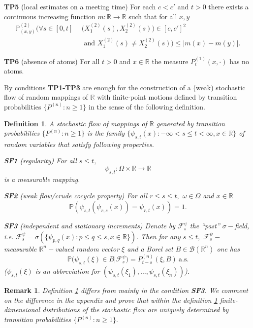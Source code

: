 \documentclass[a4paper,12pt]{article}
\newcommand{\1}{1\!\!\,{\rm I}}
\theoremstyle{plain}
\newtheorem{remark}{Remark}[section]
\newtheorem{definition}{Definition}[section]
\begin{document}
{\bf TP5} (local estimates on a meeting time) For each $c<c'$ and $t>0$ there exists a continuous increasing function $m:\mathbb{R}\to\mathbb{R}$ such that for all $x,y$
$$
\begin{aligned}
\mathbb{P}^{(2)}_{(x,y)} \Big(\forall s\in[0,t] \ \  & \big(X^{(2)}_1(s),X^{(2)}_2(s)\big)\in [c,c']^2  \\
&   \mbox{ and } X^{(2)}_1(s)\ne X^{(2)}_2(s)\Big)\leq |m(x)-m(y)|.
\end{aligned}
$$

{\bf TP6} (absence of atoms) For all $t> 0$ and $x\in\mathbb{R}$ the measure $P^{(1)}_t(x,\cdot)$ has no atoms.

By \cite[Th. 1.1]{LJR} conditions {\bf TP1-TP3} are enough for the construction of a (weak) stochastic flow of random mappings of $\mathbb{R}$ with finite-point motions defined by transition probabilities $\{P^{(n)}:n\geq 1\}$ in the sense of the following definition.

\begin{definition}\label{def29_1} \cite[Def. 1.6]{LJR} A stochastic flow of mappings of $\mathbb{R}$ generated by transition probabilities $\{P^{(n)}:n\geq 1\}$  is the family $\{\psi_{s,t}(x):-\infty<s\leq t<\infty,x\in \mathbb{R}\}$ of random variables that satisfy following properties.
	
	{\bf SF1} (regularity) For all $s\leq t,$ 
	$$
	\psi_{s,t}:\Omega\times \mathbb{R}\to \mathbb{R}
	$$
	is a measurable mapping.
	
	{\bf SF2} (weak flow/crude cocycle property) For all $r\leq s\leq t,$  $\omega\in \Omega$ and $x \in \mathbb{R}$
	$$
	\mathbb{P}(\psi_{s,t}(\psi_{r,s}(x))=\psi_{r,t}(x))=1.
	$$
	
	{\bf SF3} (independent and stationary increments) Denote by $\mathcal{F}^\psi_{s}$ the ``past'' $\sigma-$field, i.e. $	\mathcal{F}^\psi_{s}=\sigma(\{\psi_{p,q}(x):p\leq q\leq s, x\in \mathbb{R}\}).$ Then for any $s\leq t,$ $\mathcal{F}^\psi_{s}-$measurable $\mathbb{R}^n-$valued random vector  $\xi$  and a Borel set $B\in \mathcal{B}(\mathbb{R}^n)$ one has 
	$$
	\mathbb{P}\Big(\psi_{s,t}(\xi)\in B|\mathcal{F}^\psi_s\Big)=P^{(n)}_{t-s}(\xi,B) \ \mbox{a.s.}
	$$
	($\psi_{s,t}(\xi)$ is an abbreviation for $(\psi_{s,t}(\xi_1),\ldots,\psi_{s,t}(\xi_n))$).
	
\end{definition}

\begin{remark} Definition \ref{def29_1} differs from \cite[Def. 1.6]{LJR} mainly in the condition {\bf SF3}. We comment on the difference in the appendix and prove that within the definition \ref{def29_1} finite-dimensional distributions of the stochastic flow are uniquely determined by transition probabilities $\{P^{(n)}:n\geq 1\}.$
\end{remark}
\end{document}
